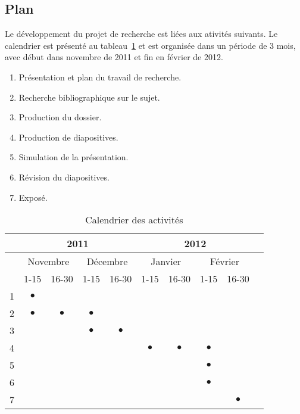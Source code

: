 \documentclass[a4paper,12pt]{article}
\begin{document}
\titleTMB 
\newpage

\subsection*{Plan}
\label{subsec:cronograma}
Le développement du projet de recherche est liées aux ativités suivants. Le
calendrier est présenté au tableau~\ref{tab:cronograma} et est organisée dans un
période de 3 mois, avec début dans novembre de 2011 et fin en février de 2012.

\begin{enumerate}
\item Présentation et plan du travail de recherche.
\item Recherche bibliographique sur le sujet.
\item Production du dossier.
\item Production de diapositives.
\item Simulation de la présentation.
\item Révision du diapositives.
\item Exposé.

\end{enumerate}

\begin{table}[h]
\caption{Calendrier des activités}
\begin{center} {
  \begin{tabular}{ |c|c|c|c|c|c|c|c|c|c|}
      \hline
      & \multicolumn{4}{|c|}{2011} & \multicolumn{4}{|c|}{2012}\\ \hline
      \hline
      &   \multicolumn{2}{|c|}{Novembre}   &  \multicolumn{2}{|c|}{Décembre}& \multicolumn{2}{|c|}{Janvier} & \multicolumn{2}{|c|}{Février} \\ \hline
      \hline
      & 1-15 & 16-30 & 1-15 & 16-30 & 1-15 & 16-30 & 1-15 & 16-30 \\ \hline
      1 & $\bullet$ & & & & & & & \\ \hline
      2 & $\bullet$ & $\bullet$ & $\bullet$ & & & & & \\ \hline
      3 &  &  & $\bullet$ & $\bullet$& & & & \\ \hline
      4 & & & & & $\bullet$ & $\bullet$& $\bullet$ & \\ \hline
      5 & & & & & & & $\bullet$ & \\ \hline
      6 & & & & & & & $\bullet$ & \\ \hline
      7 & & & & & & & & $\bullet$\\ \hline

    \end{tabular}
  }\end{center}
\label{tab:cronograma}
\end{table}
\end{document}
